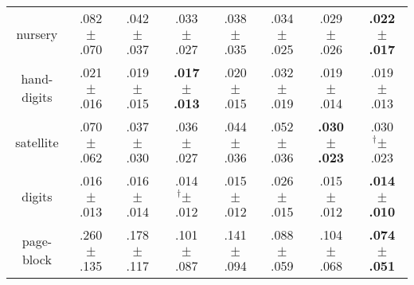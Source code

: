 \begin{tabular}{|c|ccccccc|}
nursery & .082$^{\phantom{\dag}}\pm^{\phantom{\dag}}$.070\cellcolor{red!40} & .042$^{\phantom{\dag}}\pm^{\phantom{\dag}}$.037\cellcolor{green!12} & .033$^{\phantom{\dag}}\pm^{\phantom{\dag}}$.027\cellcolor{green!24} & .038$^{\phantom{\dag}}\pm^{\phantom{\dag}}$.035\cellcolor{green!18} & .034$^{\phantom{\dag}}\pm^{\phantom{\dag}}$.025\cellcolor{green!22} & .029$^{\phantom{\dag}}\pm^{\phantom{\dag}}$.026\cellcolor{green!29} & \textbf{.022$^{\phantom{\dag}}\pm^{\phantom{\dag}}$.017}\cellcolor{green!40} \\
hand-digits & .021$^{\phantom{\dag}}\pm^{\phantom{\dag}}$.016\cellcolor{green!18} & .019$^{\phantom{\dag}}\pm^{\phantom{\dag}}$.015\cellcolor{green!27} & \textbf{.017$^{\phantom{\dag}}\pm^{\phantom{\dag}}$.013}\cellcolor{green!40} & .020$^{\phantom{\dag}}\pm^{\phantom{\dag}}$.015\cellcolor{green!25} & .032$^{\phantom{\dag}}\pm^{\phantom{\dag}}$.019\cellcolor{red!40} & .019$^{\phantom{\dag}}\pm^{\phantom{\dag}}$.014\cellcolor{green!28} & .019$^{\phantom{\dag}}\pm^{\phantom{\dag}}$.013\cellcolor{green!31} \\
satellite & .070$^{\phantom{\dag}}\pm^{\phantom{\dag}}$.062\cellcolor{red!40} & .037$^{\phantom{\dag}}\pm^{\phantom{\dag}}$.030\cellcolor{green!25} & .036$^{\phantom{\dag}}\pm^{\phantom{\dag}}$.027\cellcolor{green!28} & .044$^{\phantom{\dag}}\pm^{\phantom{\dag}}$.036\cellcolor{green!11} & .052$^{\phantom{\dag}}\pm^{\phantom{\dag}}$.036\cellcolor{red!4} & \textbf{.030$^{\phantom{\dag}}\pm^{\phantom{\dag}}$.023}\cellcolor{green!40} & .030$^{\dag}\pm^{\phantom{\dag}}$.023\cellcolor{green!38} \\
digits & .016$^{\phantom{\dag}}\pm^{\phantom{\dag}}$.013\cellcolor{green!27} & .016$^{\phantom{\dag}}\pm^{\phantom{\dag}}$.014\cellcolor{green!25} & .014$^{\dag}\pm^{\phantom{\dag}}$.012\cellcolor{green!37} & .015$^{\phantom{\dag}}\pm^{\phantom{\dag}}$.012\cellcolor{green!30} & .026$^{\phantom{\dag}}\pm^{\phantom{\dag}}$.015\cellcolor{red!40} & .015$^{\phantom{\dag}}\pm^{\phantom{\dag}}$.012\cellcolor{green!31} & \textbf{.014$^{\phantom{\dag}}\pm^{\phantom{\dag}}$.010}\cellcolor{green!40} \\
page-block & .260$^{\phantom{\dag}}\pm^{\phantom{\dag}}$.135\cellcolor{red!40} & .178$^{\phantom{\dag}}\pm^{\phantom{\dag}}$.117\cellcolor{red!4} & .101$^{\phantom{\dag}}\pm^{\phantom{\dag}}$.087\cellcolor{green!28} & .141$^{\phantom{\dag}}\pm^{\phantom{\dag}}$.094\cellcolor{green!11} & .088$^{\phantom{\dag}}\pm^{\phantom{\dag}}$.059\cellcolor{green!34} & .104$^{\phantom{\dag}}\pm^{\phantom{\dag}}$.068\cellcolor{green!27} & \textbf{.074$^{\phantom{\dag}}\pm^{\phantom{\dag}}$.051}\cellcolor{green!40} \\

\end{tabular}
